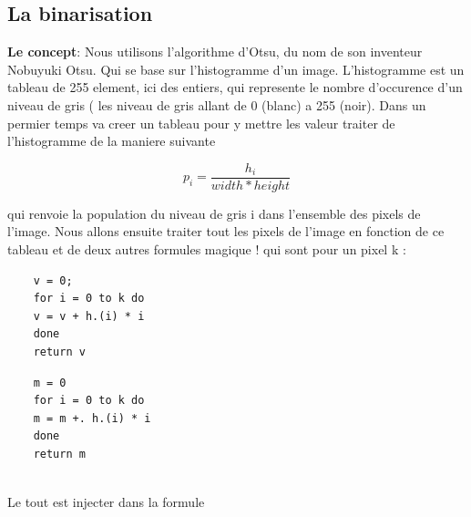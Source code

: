 \subsection{La binarisation}
\textbf{Le concept}:
Nous utilisons l'algorithme d'Otsu, du nom de son inventeur Nobuyuki Otsu. Qui se base sur l'histogramme d'un image. L'histogramme est un tableau de 255 element, ici des entiers, qui represente le nombre d'occurence d'un niveau de gris ( les niveau de gris allant de 0 (blanc) a 255 (noir). Dans un permier temps va creer un tableau pour y mettre les valeur traiter de l'histogramme de la maniere suivante
\begin{center}
	\[ p_{i} = \frac{h_{i}} {width * height}\]
\end{center}
qui renvoie la population du niveau de gris i dans l'ensemble des pixels de l'image.
Nous allons ensuite traiter tout les pixels de l'image en fonction de ce tableau et de deux autres formules magique ! qui sont pour un pixel k :\\
\begin{minipage}[h]{5cm}
	\begin{lstlisting}
	v = 0;
	for i = 0 to k do
	v = v + h.(i) * i
	done
	return v
	\end{lstlisting}
\end{minipage}
\begin{minipage}[h]{5cm}
	\begin{lstlisting}
	m = 0
	for i = 0 to k do
	m = m +. h.(i) * i
	done
	return m
	\end{lstlisting}
\end{minipage}
\vspace{0.8cm}
\\Le tout est injecter dans la formule

